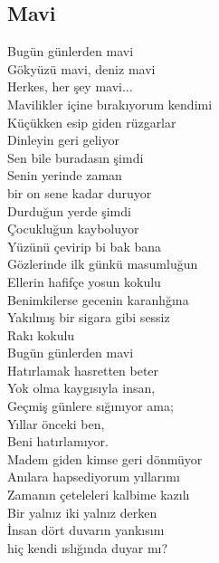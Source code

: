 \subsection{Mavi}

Bugün günlerden mavi \\
Gökyüzü mavi, deniz mavi \\
Herkes, her şey mavi... \\
Mavilikler içine bırakıyorum kendimi \\
Küçükken esip giden rüzgarlar \\
Dinleyin geri geliyor \\

\noindent\newline
Sen bile buradasın şimdi \\
Senin yerinde zaman \\
bir on sene kadar duruyor \\
Durduğun yerde şimdi \\
Çocukluğun kayboluyor \\
Yüzünü çevirip bi bak bana \\
Gözlerinde ilk günkü masumluğun \\
Ellerin hafifçe yosun kokulu \\

\noindent\newline
Benimkilerse gecenin karanlığına \\
Yakılmış bir sigara gibi sessiz \\
Rakı kokulu \\

\noindent\newline
Bugün günlerden mavi \\
Hatırlamak hasretten beter \\
Yok olma kaygısıyla insan, \\
Geçmiş günlere sığınıyor ama; \\
Yıllar önceki ben, \\
Beni hatırlamıyor. \\

\noindent\newline
Madem giden kimse geri dönmüyor \\
Anılara hapsediyorum yıllarımı \\
Zamanın çeteleleri kalbime kazılı \\
Bir yalnız iki yalnız derken \\
İnsan dört duvarın yankısını \\
hiç kendi ıslığında duyar mı? \\

